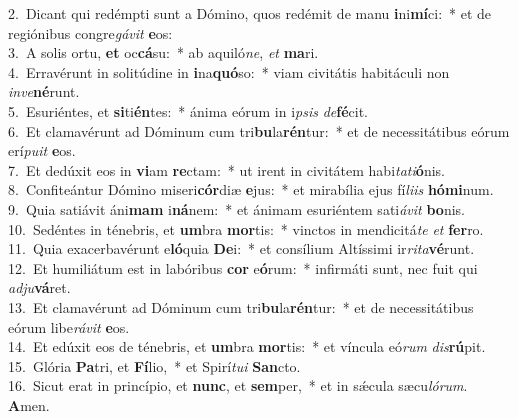 {2.~}Dicant qui redémpti sunt a Dómino, quos redémit de manu \textbf{i}ni\textbf{mí}ci:~* et de regiónibus congre\textit{gá}\textit{vit} \textbf{e}os:\\
{3.~}A solis ortu, \textbf{et} oc\textbf{cá}su:~* ab aquiló\textit{ne}, \textit{et} \textbf{ma}ri.\\
{4.~}Erravérunt in solitúdine in \textbf{i}na\textbf{quó}so:~* viam civitátis habitáculi non \textit{in}\textit{ve}\textbf{né}runt.\\
{5.~}Esuriéntes, et \textbf{si}ti\textbf{én}tes:~* ánima eórum in i\textit{psis} \textit{de}\textbf{fé}cit.\\
{6.~}Et clamavérunt ad Dóminum cum tri\textbf{bu}la\textbf{rén}tur:~* et de necessitátibus eórum erí\textit{pu}\textit{it} \textbf{e}os.\\
{7.~}Et dedúxit eos in \textbf{vi}am \textbf{re}ctam:~* ut irent in civitátem habi\textit{ta}\textit{ti}\textbf{ó}nis.\\
{8.~}Confiteántur Dómino miseri\textbf{cór}diæ \textbf{e}jus:~* et mirabília ejus fí\textit{li}\textit{is} \textbf{hó}\textbf{mi}num.\\
{9.~}Quia satiávit áni\textbf{mam} i\textbf{ná}nem:~* et ánimam esuriéntem sati\textit{á}\textit{vit} \textbf{bo}nis.\\
{10.~}Sedéntes in ténebris, et \textbf{um}bra \textbf{mor}tis:~* vinctos in mendicitá\textit{te} \textit{et} \textbf{fer}ro.\\
{11.~}Quia exacerbavérunt e\textbf{ló}quia \textbf{De}i:~* et consílium Altíssimi ir\textit{ri}\textit{ta}\textbf{vé}runt.\\
{12.~}Et humiliátum est in labóribus \textbf{cor} e\textbf{ó}rum:~* infirmáti sunt, nec fuit qui \textit{ad}\textit{ju}\textbf{vá}ret.\\
{13.~}Et clamavérunt ad Dóminum cum tri\textbf{bu}la\textbf{rén}tur:~* et de necessitátibus eórum libe\textit{rá}\textit{vit} \textbf{e}os.\\
{14.~}Et edúxit eos de ténebris, et \textbf{um}bra \textbf{mor}tis:~* et víncula eó\textit{rum} \textit{dis}\textbf{rú}pit.\\
{15.~}Glória \textbf{Pa}tri, et \textbf{Fí}lio,~* et Spirí\textit{tu}\textit{i} \textbf{San}cto.\\
{16.~}Sicut erat in princípio, et \textbf{nunc}, et \textbf{sem}per,~* et in sǽcula sæcu\textit{ló}\textit{rum}. \textbf{A}men.\\

